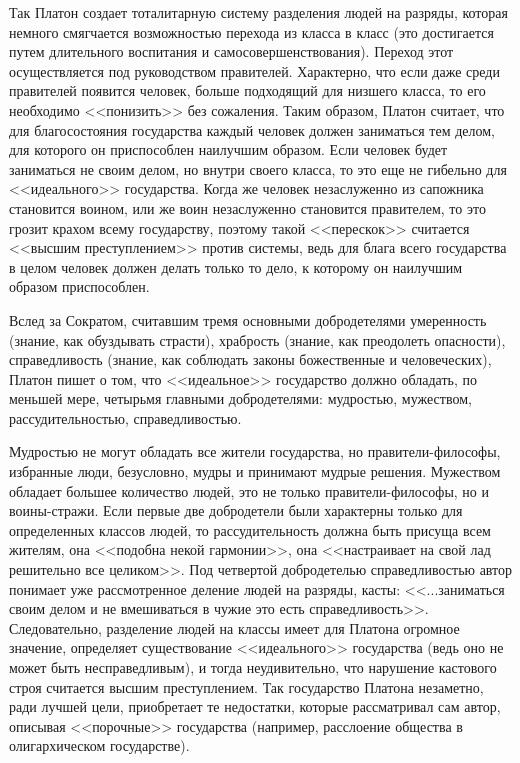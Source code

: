 	Так Платон создает тоталитарную систему разделения людей на разряды, 
	которая немного смягчается возможностью перехода из класса в класс 
	(это достигается путем длительного воспитания и самосовершенствования). 
	Переход этот осуществляется под руководством правителей. Характерно, что 
	если даже среди правителей появится человек, больше подходящий для низшего 
	класса, то его необходимо <<понизить>> без сожаления. Таким образом, Платон 
	считает, что для благосостояния государства каждый человек должен 
	заниматься тем делом, для которого он приспособлен наилучшим образом. 
	Если человек будет заниматься не своим делом, но внутри своего класса, то 
	это еще не гибельно для <<идеального>> государства. Когда же человек 
	незаслуженно из сапожника становится воином, или же воин незаслуженно 
	становится правителем, то это грозит крахом всему государству, 
	поэтому такой <<перескок>> считается <<высшим преступлением>> против 
	системы, ведь для блага всего государства в целом человек должен делать 
	только то дело, к которому он наилучшим образом приспособлен. 

	Вслед за Сократом, считавшим тремя основными добродетелями умеренность 
	(знание, как обуздывать страсти), храбрость (знание, как преодолеть 
	опасности), справедливость (знание, как соблюдать законы божественные 
	и человеческих), Платон пишет о том, что <<идеальное>> государство должно 
	обладать, по меньшей мере, четырьмя главными добродетелями: мудростью, 
	мужеством, рассудительностью, справедливостью. 

	Мудростью не могут обладать все жители государства, но правители-философы, 
	избранные люди, безусловно, мудры и принимают мудрые решения. Мужеством 
	обладает большее количество людей, это не только правители-философы, но 
	и воины-стражи. Если первые две добродетели были характерны только для 
	определенных классов людей, то рассудительность должна быть присуща всем 
	жителям, она <<подобна некой гармонии>>, она <<настраивает на свой лад решительно 
	все целиком>>. Под четвертой добродетелью справедливостью автор понимает уже 
	рассмотренное деление людей на разряды, касты: <<...заниматься своим делом и не 
	вмешиваться в чужие это есть справедливость>>. Следовательно, разделение людей 
	на классы имеет для Платона огромное значение, определяет существование 
	<<идеального>> государства (ведь оно не может быть несправедливым), и тогда 
	неудивительно, что нарушение кастового строя считается высшим 
	преступлением. Так государство Платона незаметно, ради лучшей цели, 
	приобретает те недостатки, которые рассматривал сам автор, описывая 
	<<порочные>> государства (например, расслоение общества в олигархическом 
	государстве).

